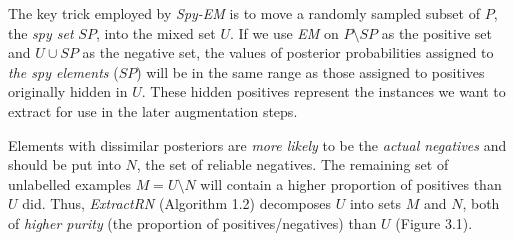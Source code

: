 \documentclass[12pt,twoside,notitlepage,amsart]{report} %
\begin{document}
	
	The {key trick} employed by \emph{Spy-EM} is to move a {randomly sampled subset} of $P$, the \emph{spy set} $SP$, into the mixed set $U$. If we use \emph{EM} on $P \setminus SP$ as the positive set and $U \cup SP$ as the negative set, the values of posterior probabilities assigned to \emph{the spy elements} ($SP$) will be in the same range as those assigned to positives originally {hidden} in $U$. These hidden positives represent the instances we want to extract for use in the later augmentation steps. 
	
Elements with dissimilar posteriors are \emph{more likely} to be the \emph{actual negatives} and should be put into $N$, the set of reliable negatives. The remaining set of unlabelled examples $M = U \setminus N$ will contain a higher proportion of positives than $U$ did. Thus, \emph{ExtractRN} (Algorithm 1.2) decomposes $U$ into sets $M$ and $N$, both of \emph{higher purity} (the proportion of positives/negatives) than $U$ (Figure 3.1). \\
	
\end{document}
